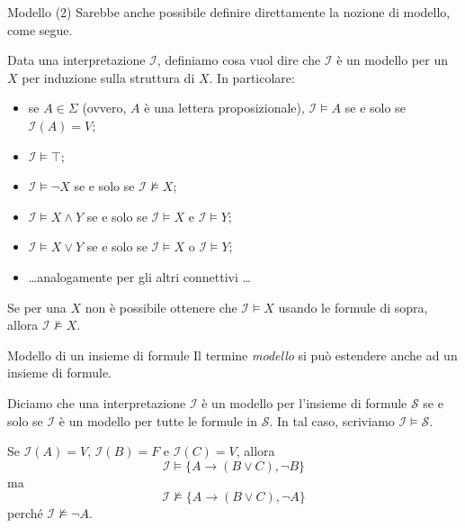 \documentclass[aspectratio=169,10pt,dvipsnames,xcolor=table,handout]{beamer}
\newcommand{\mcI}{\mathcal{I}}
\begin{document}
\begin{frame}{Modello (2)}
    Sarebbe anche possibile definire direttamente la nozione di modello, come segue.

    \begin{definition}
        Data una interpretazione $\mcI$, definiamo cosa vuol dire che $\mcI$ è un \alert{modello} per un \fp $X$ per induzione sulla struttura di $X$. In particolare:
        \begin{itemize}
            \item se $A \in \Sigma$ (ovvero, $A$ è una lettera proposizionale), $\mcI \models A$ se e solo se $\mcI(A)=V$;
            \item $\mcI \models \top$;
            \item $\mcI \models \neg X$ se e solo se $\mcI \not\models X$;
            \item $\mcI \models X \wedge Y$ se e solo se $\mcI \models X$ e $\mcI \models Y$;
            \item $\mcI \models X \vee Y$ se e solo se $\mcI \models X$ o $\mcI \models Y$;
            \item \ldots analogamente per gli altri connettivi \ldots
        \end{itemize}
    \end{definition}
    Se per una \fp $X$ non è possibile ottenere che $\mcI \models X$ usando le formule di sopra, allora $\mcI \not\models X$.
\end{frame}

\begin{frame}{Modello di un insieme di formule}
    Il termine \emph{modello} si può estendere anche ad un insieme di formule.
    \begin{definition}
        Diciamo che una interpretazione $\mcI$ è un modello per l'insieme di formule $\mathcal S$ se e solo se $\mcI$ è un modello per tutte le formule in $\mathcal S$. In tal caso, scriviamo $\mcI \models \mathcal S$.
    \end{definition}

    \pause
    \begin{example}
        Se $\mcI(A)=V$, $\mcI(B)=F$ e $\mcI(C)=V$, allora
        \[
            \mcI \models \{A \to (B \vee C), \neg B\}
        \]
        ma
        \[
            \mcI \not\models \{A \to (B \vee C), \neg A\}
        \]
        perché $\mcI \not\models \neg A$.
    \end{example}
\end{frame}
\end{document}
